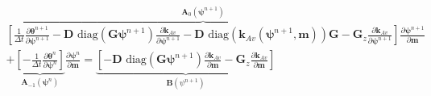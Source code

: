 \begin{align}
\label{eq:richards-timestep-deriv-blocks}
\overbrace{
    \left[
        \frac{1}{\Delta t}
        \frac{\partial \boldsymbol{\theta}^{n+1}}{\partial\boldsymbol{\psi}^{n+1}}
        -\mathbf{D}
        \text{ diag}\left( \mathbf{G} \boldsymbol{\psi}^{n+1} \right)
        \frac{\partial \mathbf{k}_{Av}}{\partial\boldsymbol{\psi}^{n+1}}
        -\mathbf{D}
        \text{ diag}\left( \mathbf{k}_{Av}(\boldsymbol{\psi}^{n+1},\mathbf{m}) \right)
        \mathbf{G}
        - \mathbf{G}_{z}
        \frac{\partial \mathbf{k}_{Av}}{\partial\boldsymbol{\psi}^{n+1}}
    \right]
}^{\mathbf{A}_0(\boldsymbol{\psi}^{n+1})}
\frac{\partial \boldsymbol{\psi}^{n+1}}{\partial\mathbf{m}}
\nonumber\\
+
\underbrace{
    \left[
        -\frac{1}{\Delta t}
        \frac{\partial \boldsymbol{\theta}^n}{\partial\boldsymbol{\psi}^n}
    \right]
}_{\mathbf{A}_{-1}(\boldsymbol{\psi}^n)}
\frac{\partial \boldsymbol{\psi}^n}{\partial\mathbf{m}}
=
\underbrace{
\left[
    -\mathbf{D}
    \text{ diag}\left( \mathbf{G} \boldsymbol{\psi}^{n+1} \right)
    \frac{\partial \mathbf{k}_{Av}}{\partial\mathbf{m}}
    -\mathbf{G}_{z}
    \frac{\partial \mathbf{k}_{Av}}{\partial\mathbf{m}}
\right]
}_{\mathbf{B}(\psi^{n+1})}&
\end{align}
